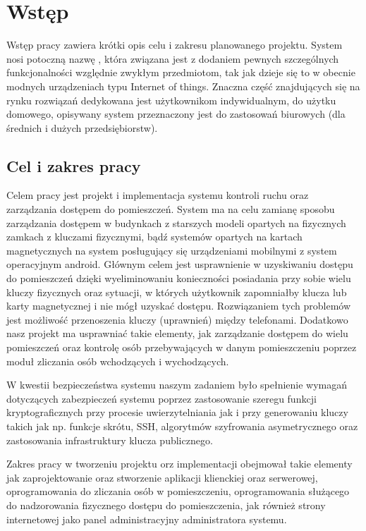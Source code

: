 \newpage\section{Wstęp}\label{sec:wstep}
Wstęp pracy zawiera krótki opis celu i zakresu planowanego projektu. System nosi potoczną nazwę \NazwaSys, która związana jest z dodaniem  pewnych szczególnych funkcjonalności względnie zwykłym przedmiotom, tak jak dzieje się to w obecnie modnych urządzeniach typu Internet of things. Znaczna część znajdujących się na rynku rozwiązań dedykowana jest użytkownikom indywidualnym, do użytku domowego, opisywany system przeznaczony jest do zastosowań biurowych (dla średnich i dużych przedsiębiorstw).

\subsection{Cel i zakres pracy}

Celem pracy jest projekt i implementacja systemu kontroli ruchu oraz zarządzania dostępem do pomieszczeń. System ma na celu zamianę sposobu zarządzania dostępem w budynkach z starszych modeli opartych na fizycznych zamkach z kluczami fizycznymi, bądź systemów opartych na kartach magnetycznych na system posługujący się urządzeniami mobilnymi z system operacyjnym android. Głównym celem jest usprawnienie w uzyskiwaniu dostępu do pomieszczeń dzięki wyeliminowaniu konieczności posiadania przy sobie wielu kluczy fizycznych oraz sytuacji, w których użytkownik zapomniałby klucza lub karty magnetycznej i nie mógł uzyskać dostępu. Rozwiązaniem tych problemów jest możliwość przenoszenia kluczy (uprawnień) między telefonami. Dodatkowo nasz projekt ma usprawniać takie elementy, jak zarządzanie dostępem do wielu pomieszczeń oraz kontrolę osób przebywających w danym pomieszczeniu poprzez moduł zliczania osób wchodzących i wychodzących.
	
W kwestii bezpieczeństwa systemu naszym zadaniem było spełnienie wymagań dotyczących zabezpieczeń systemu poprzez zastosowanie szeregu funkcji kryptograficznych przy procesie uwierzytelniania jak i przy generowaniu kluczy takich jak np. funkcje skrótu, SSH, algorytmów szyfrowania asymetrycznego oraz zastosowania infrastruktury klucza publicznego.

Zakres pracy w tworzeniu projektu orz implementacji obejmował takie elementy jak zaprojektowanie oraz stworzenie aplikacji klienckiej oraz serwerowej, oprogramowania do zliczania osób w pomieszczeniu, oprogramowania służącego do nadzorowania fizycznego dostępu do pomieszczenia, jak również strony internetowej jako panel administracyjny administratora systemu.

